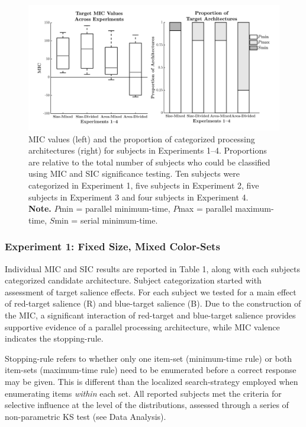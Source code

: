 \begin{figure}[hbt]
\centering \includegraphics[width=\linewidth]{Figures/EstSystems/FIG10JPG.jpg}
\caption{MIC values (left) and the proportion of categorized processing architectures (right) for subjects in Experiments 1--4. Proportions are relative to the total number of subjects who could be classified using MIC and SIC significance testing. Ten subjects were categorized in Experiment 1, five subjects in Experiment 2, five subjects in Experiment 3 and four subjects in Experiment 4. \\ \textbf{Note.} $P$min = parallel minimum-time, $P$max = parallel maximum-time, $S$min = serial minimum-time.}
\label{fig:MICandProp_AB}
\end{figure}

\subsubsection{Experiment 1: Fixed Size, Mixed Color-Sets}
Individual MIC and SIC results are reported in Table 1, along with each subjects categorized candidate architecture. Subject categorization started with assessment of target salience effects. For each subject we tested for a main effect of red-target salience (R) and blue-target salience (B). Due to the construction of the MIC, a significant interaction of red-target and blue-target salience provides supportive evidence of a parallel processing architecture, while MIC valence indicates the stopping-rule. 


Stopping-rule refers to whether only one item-set (minimum-time rule) or both item-sets (maximum-time rule) need to be enumerated before a correct response may be given. This is different than the localized search-strategy employed when enumerating items \textit{within} each set. All reported subjects met the criteria for selective influence at the level of the distributions, assessed through a series of non-parametric KS test (see Data Analysis).

